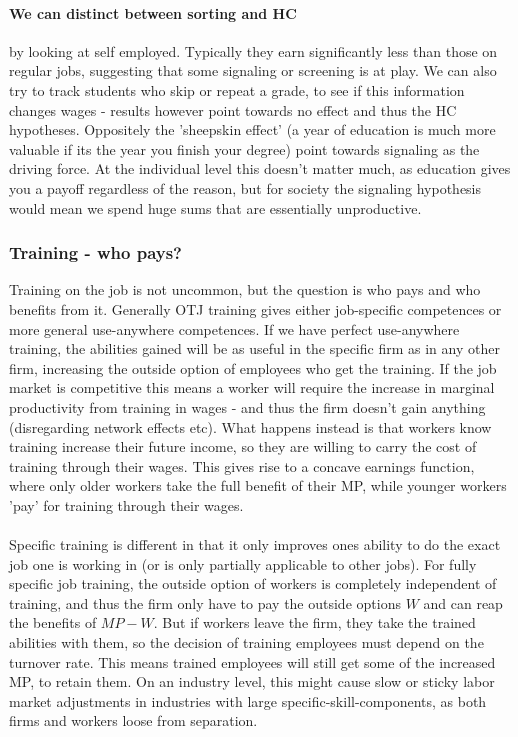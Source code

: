 \documentclass[12pt, a4paper]{article}
\begin{document}
\begin{multicols}{2}
\paragraph{We can distinct between sorting and HC} by looking at self employed. Typically they earn significantly less than those on regular jobs, suggesting that some signaling or screening is at play. We can also try to track students who skip or repeat a grade, to see if this information changes wages - results however point towards no effect and thus the HC hypotheses.
Oppositely the 'sheepskin effect' (a year of education is much more valuable if its the year you finish your degree) point towards signaling as the driving force. At the individual level this doesn't matter much, as education gives you a payoff regardless of the reason, but for society the signaling hypothesis would mean we spend huge sums that are essentially unproductive.

\subsubsection{Training - who pays?}
Training on the job is not uncommon, but the question is who pays and who benefits from it. Generally OTJ training gives either job-specific competences or more general use-anywhere competences. If we have perfect use-anywhere training, the abilities gained will be as useful in the specific firm as in any other firm, increasing the outside option of employees who get the training. If the job market is competitive this means a worker will require the increase in marginal productivity from training in wages - and thus the firm doesn't gain anything (disregarding network effects etc). What happens instead is that workers know training increase their future income, so they are willing to carry the cost of training through their wages. This gives rise to a concave earnings function, where only older workers take the full benefit of their MP, while younger workers 'pay' for training through their wages.
\\ \\
Specific training is different in that it only improves ones ability to do the exact job one is working in (or is only partially applicable to other jobs). For fully specific job training, the outside option of workers is completely independent of training, and thus the firm only have to pay the outside options $W$ and can reap the benefits of $MP-W$. But if workers leave the firm, they take the trained abilities with them, so the decision of training employees must depend on the turnover rate. This means trained employees will still get some of the increased MP, to retain them. On an industry level, this might cause slow or sticky labor market adjustments in industries with large specific-skill-components, as both firms and workers loose from separation.




\end{multicols}
\end{document}
